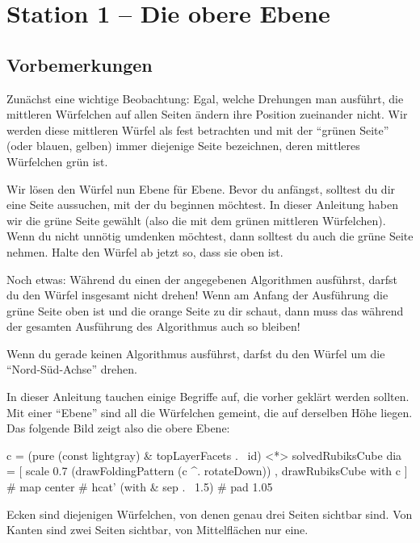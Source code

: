 \documentclass[12pt]{scrartcl}
\theoremstyle{definition}
\begin{document}
\section{Station 1 -- Die obere Ebene}

\subsection{Vorbemerkungen}

Zunächst eine wichtige Beobachtung: Egal, welche Drehungen man ausführt, die mittleren Würfelchen auf allen Seiten ändern ihre
Position zueinander nicht. Wir werden diese mittleren Würfel als fest betrachten und mit der "`grünen Seite"' (oder blauen,
gelben) immer diejenige Seite bezeichnen, deren mittleres Würfelchen grün ist.

Wir lösen den Würfel nun Ebene für Ebene. Bevor du anfängst, solltest du dir eine Seite aussuchen, mit der du beginnen möchtest.
In dieser Anleitung haben wir die grüne Seite gewählt (also die mit dem grünen mittleren Würfelchen). Wenn du nicht unnötig umdenken möchtest, dann solltest du auch die grüne Seite nehmen. Halte den Würfel ab jetzt so, dass sie oben ist.

Noch etwas: Während du einen der angegebenen Algorithmen ausführst, darfst du den Würfel insgesamt nicht drehen!
Wenn am Anfang der Ausführung die grüne Seite oben ist und die orange Seite zu dir schaut, dann muss das während der gesamten Ausführung des Algorithmus auch so bleiben!

Wenn du gerade keinen Algorithmus ausführst, darfst du den Würfel um die "`Nord-Süd-Achse"' drehen.

In dieser Anleitung tauchen einige Begriffe auf, die vorher geklärt werden sollten. Mit einer "`Ebene"' sind all die Würfelchen
gemeint, die auf derselben Höhe liegen. Das folgende Bild zeigt also die obere Ebene:

\begin{center}
  \begin{cube-diagram}[width=300,height=100]
c = (pure (const lightgray) & topLayerFacets .~ id) <*> solvedRubiksCube
dia = [ scale 0.7 (drawFoldingPattern (c ^. rotateDown))
      , drawRubiksCube with c
      ] # map center # hcat' (with & sep .~ 1.5) # pad 1.05
  \end{cube-diagram}
\end{center}

Ecken sind diejenigen Würfelchen, von denen genau drei Seiten sichtbar sind.
Von Kanten sind zwei Seiten sichtbar, von Mittelflächen nur eine.
\end{document}
